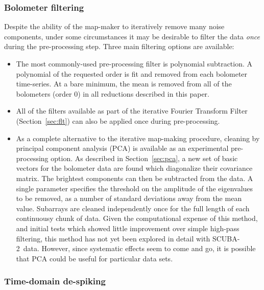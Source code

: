 \documentclass[useAMS,usenatbib,nofootinbib]{mn2e}
\newcommand{\scuba}{SCUBA-2}
\begin{document}
\subsubsection{Bolometer filtering}

Despite the ability of the map-maker to iteratively remove many noise
components, under some circumstances it may be desirable to filter the
data \emph{once} during the pre-processing step. Three main filtering
options are available:

\begin{itemize}

\item The most commonly-used pre-processing filter is polynomial
subtraction. A polynomial of the requested order is fit and removed
from each bolometer time-series. At a bare minimum, the mean is
removed from all of the bolometers (order 0) in all reductions
described in this paper.

\item All of the filters available as part of the iterative Fourier
Transform Filter (Section~\ref{sec:flt}) can also be applied once
during pre-processing.

\item As a complete alternative to the iterative map-making procedure,
cleaning by principal component analysis (PCA) is available as an
experimental pre-processing option. As described in
Section~\ref{sec:pca}, a new set of basic vectors for the bolometer
data are found which diagonalize their covariance matrix. The
brightest components can then be subtracted from the data. A single
parameter specifies the threshold on the amplitude of the eigenvalues
to be removed, as a number of standard deviations away from the mean
value. Subarrays are cleaned independently once for the full length of
each continuousy chunk of data. Given the computational expense of
this method, and initial tests which showed little improvement over
simple high-pass filtering, this method has not yet been explored in
detail with \scuba\ data. However, since systematic effects seem to
come and go, it is possible that PCA could be useful for particular
data sets.

\end{itemize}


\subsubsection{Time-domain de-spiking}
\label{sec:timedespike}
\end{document}
